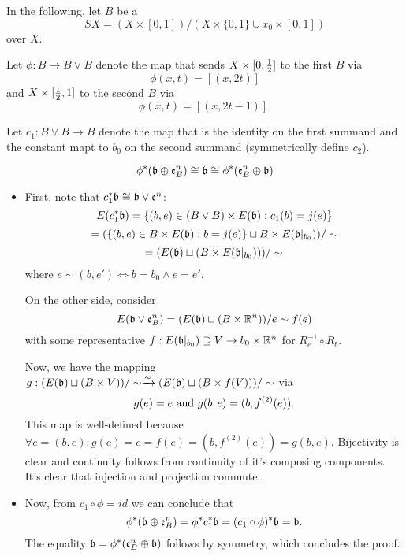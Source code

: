 \begin{myparagraph}
    In the following, let $B$ be a 
    \[ SX = (X \times [0, 1]) / (X \times \{ 0, 1 \} \cup x_0 \times [0, 1])\]
    over $X$.

    Let $\phi: B \to B \vee B$ denote the map that sends
    $X \times [0, \frac{1}{2}]$ to the first $B$ via
    \[ \phi(x, t) = [(x, 2t)] \]
    and $X \times [\frac{1}{2}, 1]$ to the second $B$ via
    \[ \phi(x, t) = [(x, 2t - 1)]. \]

    Let $c_1: B \vee B \to B$ denote the map that is the identity on the first summand
    and the constant mapt to $b_0$ on the second summand (symmetrically define $c_2$).
\end{myparagraph}

\begin{mylemma}\label{suspension::triviality}
    \[ \phi^*(\mathfrak{b} \oplus \mathfrak{e}^n_B) \cong \mathfrak{b} \cong \phi^*(\mathfrak{e}^n_B \oplus \mathfrak{b}) \]
\end{mylemma}
\begin{myproof}
    \begin{itemize}
        \item First, note that $c_1^*\mathfrak{b} \cong \mathfrak{b} \vee \mathfrak{e}^n$:
        \[ E(c_1^*\mathfrak{b}) = \{(b, e) \in (B \vee B) \times E(\mathfrak{b}):c_1(b) = j(e)\} \]
        \[ = (\{(b, e) \in B \times E(\mathfrak{b}):b = j(e)\} \sqcup B \times E(\mathfrak{b}\vert_{b_0})) / \sim \]
        \[ = (E(\mathfrak{b}) \sqcup (B \times E(\mathfrak{b}\vert_{b_0}))) / \sim\]
        where $e \sim (b, e') \iff b = b_0 \land e = e'$.
        
        On the other side, consider
        \[ E(\mathfrak{b} \vee \mathfrak{e}^n_B) = (E(\mathfrak{b}) \sqcup (B \times \mathbb{R}^n)) / e \sim f(e) \]
        with some representative $f: E(\mathfrak{b}\vert_{b_0}) \supseteq{} V \to b_0 \times \mathbb{R}^n$ for $R_e^{-1} \circ R_b$.
        
        Now, we have the mapping $g: (E(\mathfrak{b}) \sqcup (B \times V)) / \sim \xrightarrow{\sim} (E(\mathfrak{b}) \sqcup (B \times f(V))) / \sim$ via
        \[ g(e) = e \text{ and } g(b, e) = (b, f^{(2)}(e)). \]
        This map is well-defined because $\forall e = (b, e): g(e) = e = f(e) = (b, f^{(2)}(e)) = g(b, e)$.
        Bijectivity is clear and continuity follows from continuity of it's composing components.
        It's clear that injection and projection commute.
        \item Now, from $c_1 \circ \phi = id$ we can conclude that
        \[ \phi^*(\mathfrak{b} \oplus \mathfrak{e}^n_B) = \phi^*c_1^*\mathfrak{b} = (c_1 \circ \phi)^*\mathfrak{b} = \mathfrak{b}. \]
        The equality $\mathfrak{b} = \phi^*(\mathfrak{e}^n_B \oplus \mathfrak{b})$ follows by symmetry, which concludes the proof.
    \end{itemize}
\end{myproof}

